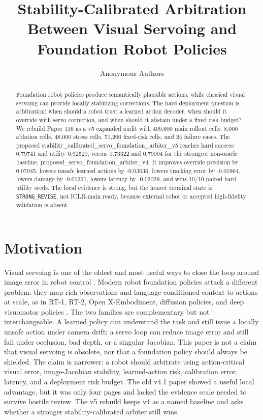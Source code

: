 \documentclass{article}
\title{Stability-Calibrated Arbitration Between Visual Servoing and Foundation Robot Policies}
\author{Anonymous Authors}
\begin{document}
\maketitle
\begin{abstract}
Foundation robot policies produce semantically plausible actions, while classical visual servoing can provide locally stabilizing corrections. The hard deployment question is arbitration: when should a robot trust a learned action decoder, when should it override with servo correction, and when should it abstain under a fixed risk budget? We rebuild Paper 116 as a v5 expanded audit with 409,600 main rollout cells, 8,000 ablation cells, 48,000 stress cells, 51,200 fixed-risk cells, and 24 failure cases. The proposed stability\_calibrated\_servo\_foundation\_arbiter\_v5 reaches hard success 0.79741 and utility 0.92520, versus 0.73322 and 0.79004 for the strongest non-oracle baseline, proposed\_servo\_foundation\_arbiter\_v4. It improves override precision by 0.07045, lowers unsafe learned actions by -0.03636, lowers tracking error by -0.01964, lowers damage by -0.01331, lowers latency by -0.02029, and wins 10/10 paired hard-utility seeds. The local evidence is strong, but the honest terminal state is \texttt{STRONG\_REVISE}, not ICLR-main ready, because external robot or accepted high-fidelity validation is absent.
\end{abstract}
\section{Motivation}
Visual servoing is one of the oldest and most useful ways to close the loop around image error in robot control \citep{hutchinson1996visual,chaumette2006visual,chaumette2007visual}. Modern robot foundation policies attack a different problem: they map rich observations and language-conditioned context to actions at scale, as in RT-1, RT-2, Open X-Embodiment, diffusion policies, and deep visuomotor policies \citep{brohan2023rt1,zitkovich2023rt2,openx2023,chi2023diffusion,levine2016end}. The two families are complementary but not interchangeable. A learned policy can understand the task and still issue a locally unsafe action under camera drift; a servo loop can reduce image error and still fail under occlusion, bad depth, or a singular Jacobian.
This paper is not a claim that visual servoing is obsolete, nor that a foundation policy should always be shielded. The claim is narrower: a robot should arbitrate using action-critical visual error, image-Jacobian stability, learned-action risk, calibration error, latency, and a deployment risk budget. The old v4.1 paper showed a useful local advantage, but it was only four pages and lacked the evidence scale needed to survive hostile review. The v5 rebuild keeps v4 as a named baseline and asks whether a stronger stability-calibrated arbiter still wins.
\end{document}
